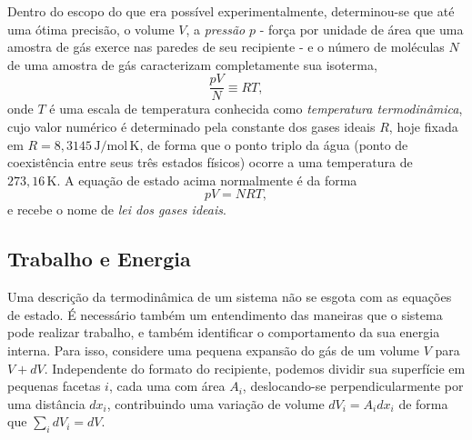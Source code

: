 \documentclass[a4paper, 12pt]{article}
\theoremstyle{definition}
\theoremstyle{definition}
\begin{document}
Dentro do escopo do que era possível experimentalmente, determinou-se que até uma ótima precisão, o 
volume $V$, a \textit{pressão} $p$ - força por unidade de área que uma amostra de gás exerce nas paredes 
de seu recipiente - e o número de moléculas $N$ de uma amostra de gás caracterizam completamente 
sua isoterma, 
$$\frac{pV}{N}\equiv RT,$$
onde $T$ é uma escala de temperatura conhecida como \textit{temperatura termodinâmica}, cujo valor numérico
é determinado pela constante dos gases ideais $R$, hoje fixada em $R=8{,}3145\,\mathrm{J/mol\,K}$, de 
forma que o ponto triplo da água (ponto de coexistência entre seus três estados físicos) ocorre a uma 
temperatura de $273{,}16\,\mathrm K$. A equação de estado acima normalmente é da forma
$$pV=NRT,$$
e recebe o nome de \textit{lei dos gases ideais}.

\subsection{Trabalho e Energia}

Uma descrição da termodinâmica de um sistema não se esgota com as equações de estado. É
necessário também um entendimento das maneiras que o sistema pode realizar trabalho, e também
identificar o comportamento da sua energia interna. Para isso, considere uma pequena expansão
do gás de um volume $V$ para $V+dV$. Independente do formato do recipiente, podemos dividir sua
superfície em pequenas facetas $i$, cada uma com área $A_i$, deslocando-se perpendicularmente
por uma distância $dx_i$, contribuindo uma variação de volume $dV_i=A_idx_i$ de forma que
$\sum_idV_i=dV$.
\end{document}
